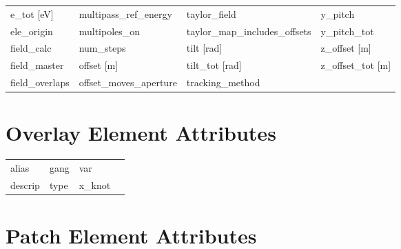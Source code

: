 \begin{tabular}{llll}
e_tot [eV]                     & multipass_ref_energy           & taylor_field                   & y_pitch                        \\
ele_origin                     & multipoles_on                  & taylor_map_includes_offsets    & y_pitch_tot                    \\
field_calc                     & num_steps                      & tilt [rad]                     & z_offset [m]                   \\
field_master                   & offset [m]                     & tilt_tot [rad]                 & z_offset_tot [m]               \\
field_overlaps                 & offset_moves_aperture          & tracking_method                &                                \\
 \bottomrule
 \end{tabular}
 \vfill
 
 \section{Overlay Element Attributes}
 \label{s:list.overlay}
 
 \begin{tabular}{llll} \toprule
alias                          & gang                           & var                            &                                \\
descrip                        & type                           & x_knot                         &                                \\
 \bottomrule
 \end{tabular}
 \vfill
 
 \section{Patch Element Attributes}
 \label{s:list.patch}
 
